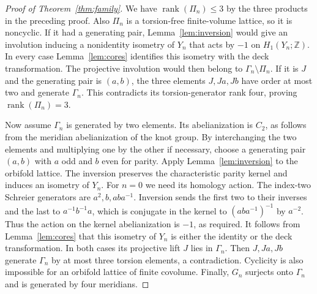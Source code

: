 \documentclass[11pt]{article}
\newcommand{\rk}{\operatorname{rank}}
\begin{document}
\begin{proof}[Proof of Theorem~\ref{thm:family}]
We have $\rk(\Pi_n)\le3$ by the three products in the preceding
proof. Also $\Pi_n$ is a torsion-free finite-volume lattice, so it
is noncyclic. If it had a generating pair, Lemma~\ref{lem:inversion}
would give an involution inducing a nonidentity isometry of $Y_n$
that acts by $-1$ on $H_1(Y_n;\mathbb Z)$. In every case
Lemma~\ref{lem:cores} identifies this isometry with the deck
transformation. The projective involution would then belong to
$\Gamma_n\setminus\Pi_n$. If it is $J$ and the generating pair is
$(a,b)$, the three elements $J,Ja,Jb$ have order at most two and
generate $\Gamma_n$. This contradicts its torsion-generator rank
four, proving $\rk(\Pi_n)=3$.

Now assume $\Gamma_n$ is generated by two elements. Its abelianization
is $C_2$, as follows from the meridian abelianization of the knot
group. By interchanging the two elements and multiplying one by the
other if necessary, choose a generating pair $(a,b)$ with $a$ odd
and $b$ even for parity. Apply Lemma~\ref{lem:inversion} to the
orbifold lattice. The inversion preserves the characteristic parity
kernel and induces an isometry of $Y_n$. For $n=0$ we need its
homology action. The index-two Schreier generators are
$a^2,b,aba^{-1}$. Inversion sends the first two to their inverses
and the last to $a^{-1}b^{-1}a$, which is conjugate in the kernel
to $(aba^{-1})^{-1}$ by $a^{-2}$. Thus the action on the kernel
abelianization is $-1$, as required. It follows from
Lemma~\ref{lem:cores} that this isometry of $Y_n$ is either the
identity or the deck transformation. In both cases its projective
lift $J$ lies in $\Gamma_n$. Then $J,Ja,Jb$ generate $\Gamma_n$
by at most three torsion elements, a contradiction. Cyclicity is
also impossible for an orbifold lattice of finite covolume. Finally,
$G_n$ surjects onto $\Gamma_n$ and is generated by four meridians.
\end{proof}
\end{document}
